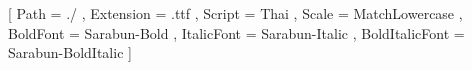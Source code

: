 %
%
%
%

\usepackage{XCharter}
\usepackage{indentfirst}
\usepackage{tabularx}
\usepackage{fontspec}
\usepackage{graphicx}                     
\usepackage{booktabs}                     

\usepackage[thai,english]{babel} 

\newfontfamily{}[
    Path = ./ ,
    Extension = .ttf ,
    Script = Thai ,
    Scale = MatchLowercase ,
    BoldFont = Sarabun-Bold , 
    ItalicFont = Sarabun-Italic ,
    BoldItalicFont = Sarabun-BoldItalic
]

\renewcommand{\textthai}[1]{{\thaifont #1}}

\usepackage[dvipsnames,svgnames]{xcolor} 

\usepackage[style=authoryear, backend=biber, natbib=true]{biblatex}
\usepackage[autostyle=true]{csquotes} 


\usepackage{geometry} 
\geometry{
    top=1cm, 
    bottom=1.5cm, 
    left=2cm, 
    right=2cm, 
    includehead, 
    includefoot, 
}

\setlength{\columnsep}{7mm} 

\usepackage{fancyhdr} 
\pagestyle{fancy} 

